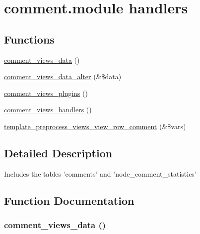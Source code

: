 \hypertarget{group__views__comment__module}{
\section{comment.module handlers}
\label{group__views__comment__module}
}
\subsection*{Functions}
\begin{CompactItemize}
\item 
\hyperlink{group__views__comment__module_g36dff975ac53893da10163d2ee59d652}{comment\_\-views\_\-data} ()
\item 
\hyperlink{group__views__comment__module_gf68bf474455d07d3fc30c9f61b830f30}{comment\_\-views\_\-data\_\-alter} (\&\$data)
\item 
\hyperlink{group__views__comment__module_g20b0377d6793f1f1e1b70bcae9dd067b}{comment\_\-views\_\-plugins} ()
\item 
\hyperlink{group__views__comment__module_gf77bd2e2e209c8442ed09037243c879b}{comment\_\-views\_\-handlers} ()
\item 
\hyperlink{group__views__comment__module_gc5f17442ee6b1364544217dc2515f0ef}{template\_\-preprocess\_\-views\_\-view\_\-row\_\-comment} (\&\$vars)
\end{CompactItemize}


\subsection{Detailed Description}
Includes the tables 'comments' and 'node\_\-comment\_\-statistics' 

\subsection{Function Documentation}
\hypertarget{group__views__comment__module_g36dff975ac53893da10163d2ee59d652}{
\subsubsection[{comment\_\-views\_\-data}]{\setlength{\rightskip}{0pt plus 5cm}comment\_\-views\_\-data ()}}
\label{group__views__comment__module_g36dff975ac53893da10163d2ee59d652}


